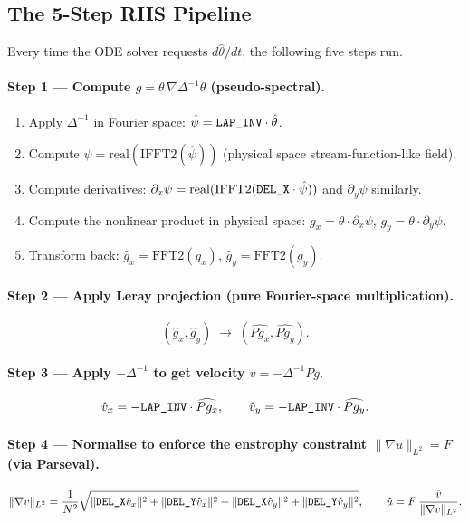 \documentclass[12pt,a4paper]{article}
\newcommand{\lapinv}{\Delta^{-1}}
\newcommand{\LAPINV}{\text{\texttt{LAP\_INV}}}
\newcommand{\DELX}{\text{\texttt{DEL\_X}}}
\newcommand{\DELY}{\text{\texttt{DEL\_Y}}}
\theoremstyle{definition}
\begin{document}
\subsection{The 5-Step RHS Pipeline}

Every time the ODE solver requests $d\hat\theta/dt$, the following five steps
run.

\paragraph{Step 1 — Compute $g = \theta\,\nabla\lapinv\theta$ (pseudo-spectral).}
\begin{enumerate}[label=\alph*.]
  \item Apply $\lapinv$ in Fourier space:
    $\hat\psi = \LAPINV\cdot\hat\theta$.
  \item Compute $\psi = \mathrm{real}(\mathrm{IFFT2}(\hat\psi))$ (physical
    space stream-function-like field).
  \item Compute derivatives:
    $\partial_x\psi = \mathrm{real}(\mathrm{IFFT2}(\DELX\cdot\hat\psi))$ and
    $\partial_y\psi$ similarly.
  \item Compute the nonlinear product in physical space:
    $g_x = \theta\cdot\partial_x\psi$, $g_y = \theta\cdot\partial_y\psi$.
  \item Transform back: $\hat g_x = \mathrm{FFT2}(g_x)$,
    $\hat g_y = \mathrm{FFT2}(g_y)$.
\end{enumerate}

\paragraph{Step 2 — Apply Leray projection (pure Fourier-space multiplication).}
\[
  (\hat g_x,\hat g_y)\;\longrightarrow\;(\widehat{Pg_x},\widehat{Pg_y}).
\]

\paragraph{Step 3 — Apply $-\lapinv$ to get velocity $v = -\lapinv Pg$.}
\[
  \hat v_x = -\LAPINV\cdot\widehat{Pg_x}, \qquad
  \hat v_y = -\LAPINV\cdot\widehat{Pg_y}.
\]

\paragraph{Step 4 — Normalise to enforce the enstrophy constraint $\|\nabla u\|_{L^2} = F$ (via Parseval).}
\[
  \|\nabla v\|_{L^2}
  = \frac{1}{N^2}\sqrt{\|\DELX\hat v_x\|^2+\|\DELY\hat v_x\|^2
                     +\|\DELX\hat v_y\|^2+\|\DELY\hat v_y\|^2},
  \qquad
  \hat u = F\,\frac{\hat v}{\|\nabla v\|_{L^2}}.
\]
\end{document}
